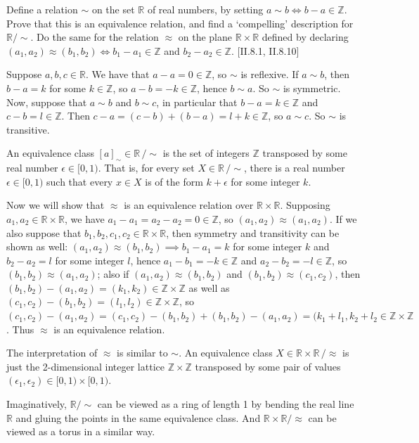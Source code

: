 \hypertarget{Exercise I.1.6}{}
\begin{problem}[1.6]
Define a relation $\sim$ on the set $\mathbb{R}$ of real numbers, by setting $a\sim b\iff b-a \in\mathbb{Z}$. Prove that this is an equivalence relation, and find a \textquoteleft compelling' description for $\mathbb{R}/\sim$. Do the same for the relation $\approx$ on the plane $\mathbb{R}\times\mathbb{R}$ defined by declaring $(a_1, a_2)\approx(b_1, b_2)\iff b_1-a_1 \in\mathbb{Z}$ and $b_2-a_2 \in\mathbb{Z}$. [\textsection II.8.1, II.8.10]
\end{problem}
\begin{solution}
Suppose $a,b,c\in\mathbb{R}$. We have that $a-a=0\in\mathbb{Z}$, so $\sim$ is reflexive. If $a\sim b$, then $b-a=k$ for some $k\in\mathbb{Z}$, so $a-b=-k\in\mathbb{Z}$, hence $b\sim a$. So $\sim$ is symmetric. Now, suppose that $a\sim b$ and $b\sim c$, in particular that $b-a=k\in\mathbb{Z}$ and $c-b=l\in\mathbb{Z}$. Then $c-a=(c-b) + (b-a) = l+k\in\mathbb{Z}$, so $a\sim c$. So $\sim$ is transitive.

An equivalence class $[a]_{\sim}\in\mathbb{R}\,/\!\sim$ is the set of integers $\mathbb{Z}$ transposed by some real number $\epsilon\in[0,1)$. That is, for every set $X\in\mathbb{R}\,/\!\sim$, there is a real number $\epsilon\in[0,1)$ such that every $x\in X$ is of the form $k+\epsilon$ for some integer $k$.

Now we will show that $\approx$ is an equivalence relation over $\mathbb{R}\times\mathbb{R}$. Supposing $a_1,a_2\in\mathbb{R}\times\mathbb{R}$, we have $a_1-a_1=a_2-a_2=0\in\mathbb{Z}$, so $(a_1,a_2)\approx(a_1,a_2)$. If we also suppose that $b_1,b_2,c_1,c_2\in\mathbb{R}\times\mathbb{R}$, then symmetry and transitivity can be shown as well: $(a_1,a_2)\approx(b_1,b_2)\implies b_1-a_1=k$ for some integer $k$ and $b_2-a_2=l$ for some integer $l$, hence $a_1-b_1=-k\in\mathbb{Z}$ and $a_2-b_2=-l\in\mathbb{Z}$, so
$(b_1,b_2)\approx(a_1,a_2)$; also if $(a_1,a_2)\approx(b_1,b_2)$ and $(b_1,b_2)\approx(c_1,c_2)$, then
$(b_1,b_2)-(a_1,a_2)=(k_1,k_2)\in\mathbb{Z}\times\mathbb{Z}$ as well as $(c_1,c_2)-(b_1,b_2)=(l_1,l_2)\in\mathbb{Z}\times\mathbb{Z}$, so $(c_1,c_2) - (a_1,a_2) = (c_1,c_2) - (b_1,b_2) + (b_1,b_2) - (a_1,a_2) = (k_1+l_1, k_2+l_2\in\mathbb{Z}\times\mathbb{Z}$. Thus $\approx$ is an equivalence relation.

The interpretation of $\approx$ is similar to $\sim$. An equivalence class $X\in\mathbb{R}\times\mathbb{R}\,/\approx$ is just the 2-dimensional integer lattice $\mathbb{Z}\times\mathbb{Z}$ transposed by some pair of values $(\epsilon_1,\epsilon_2)\in[0,1)\times[0,1)$.

Imaginatively, $\mathbb{R}/\sim$ can be viewed as a ring of length 1 by bending the real line $\mathbb{R}$ and gluing the points in the same equivalence class. And $\mathbb{R}\times\mathbb{R}/\approx$ can be viewed as a torus in a similar way.
\end{solution}





